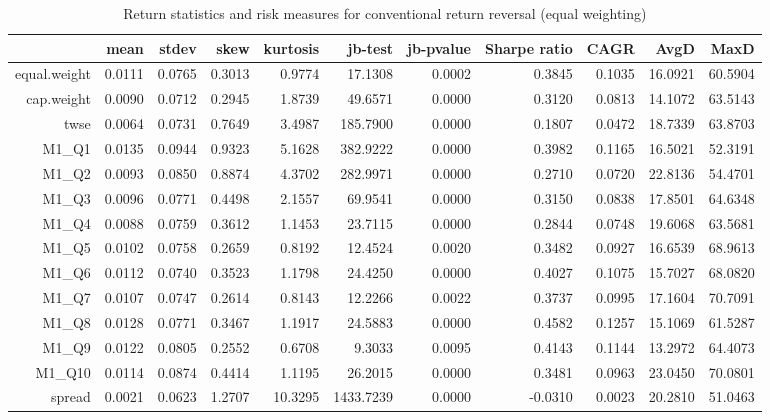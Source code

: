 \begin{table}[ht]
\centering
\begin{tabular}{rrrrrrrrrrr}
  \hline
 & mean & stdev & skew & kurtosis & jb-test & jb-pvalue & Sharpe ratio & CAGR & AvgD & MaxD \\ 
  \hline
equal.weight & 0.0111 & 0.0765 & 0.3013 & 0.9774 & 17.1308 & 0.0002 & 0.3845 & 0.1035 & 16.0921 & 60.5904 \\ 
  cap.weight & 0.0090 & 0.0712 & 0.2945 & 1.8739 & 49.6571 & 0.0000 & 0.3120 & 0.0813 & 14.1072 & 63.5143 \\ 
  twse & 0.0064 & 0.0731 & 0.7649 & 3.4987 & 185.7900 & 0.0000 & 0.1807 & 0.0472 & 18.7339 & 63.8703 \\ 
  M1\_Q1 & 0.0135 & 0.0944 & 0.9323 & 5.1628 & 382.9222 & 0.0000 & 0.3982 & 0.1165 & 16.5021 & 52.3191 \\ 
  M1\_Q2 & 0.0093 & 0.0850 & 0.8874 & 4.3702 & 282.9971 & 0.0000 & 0.2710 & 0.0720 & 22.8136 & 54.4701 \\ 
  M1\_Q3 & 0.0096 & 0.0771 & 0.4498 & 2.1557 & 69.9541 & 0.0000 & 0.3150 & 0.0838 & 17.8501 & 64.6348 \\ 
  M1\_Q4 & 0.0088 & 0.0759 & 0.3612 & 1.1453 & 23.7115 & 0.0000 & 0.2844 & 0.0748 & 19.6068 & 63.5681 \\ 
  M1\_Q5 & 0.0102 & 0.0758 & 0.2659 & 0.8192 & 12.4524 & 0.0020 & 0.3482 & 0.0927 & 16.6539 & 68.9613 \\ 
  M1\_Q6 & 0.0112 & 0.0740 & 0.3523 & 1.1798 & 24.4250 & 0.0000 & 0.4027 & 0.1075 & 15.7027 & 68.0820 \\ 
  M1\_Q7 & 0.0107 & 0.0747 & 0.2614 & 0.8143 & 12.2266 & 0.0022 & 0.3737 & 0.0995 & 17.1604 & 70.7091 \\ 
  M1\_Q8 & 0.0128 & 0.0771 & 0.3467 & 1.1917 & 24.5883 & 0.0000 & 0.4582 & 0.1257 & 15.1069 & 61.5287 \\ 
  M1\_Q9 & 0.0122 & 0.0805 & 0.2552 & 0.6708 & 9.3033 & 0.0095 & 0.4143 & 0.1144 & 13.2972 & 64.4073 \\ 
  M1\_Q10 & 0.0114 & 0.0874 & 0.4414 & 1.1195 & 26.2015 & 0.0000 & 0.3481 & 0.0963 & 23.0450 & 70.0801 \\ 
  spread & 0.0021 & 0.0623 & 1.2707 & 10.3295 & 1433.7239 & 0.0000 & -0.0310 & 0.0023 & 20.2810 & 51.0463 \\ 
   \hline
\end{tabular}
\caption{Return statistics and risk measures for conventional 
                             return reversal (equal weighting)} 
\label{tab:returnRevStats}
\end{table}
